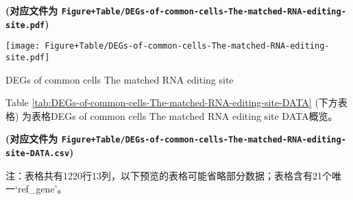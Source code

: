 \documentclass[
]{article}
\begin{document}
\textbf{(对应文件为 \texttt{Figure+Table/DEGs-of-common-cells-The-matched-RNA-editing-site.pdf})}

\def\@captype{figure}
\begin{center}
\texttt{[image: Figure+Table/DEGs-of-common-cells-The-matched-RNA-editing-site.pdf]}
\caption{DEGs of common cells The matched RNA editing site}\label{fig:DEGs-of-common-cells-The-matched-RNA-editing-site}
\end{center}

Table \ref{tab:DEGs-of-common-cells-The-matched-RNA-editing-site-DATA} (下方表格) 为表格DEGs of common cells The matched RNA editing site DATA概览。

\textbf{(对应文件为 \texttt{Figure+Table/DEGs-of-common-cells-The-matched-RNA-editing-site-DATA.csv})}

\begin{center}\begin{tcolorbox}[colback=gray!10, colframe=gray!50, width=0.9\linewidth, arc=1mm, boxrule=0.5pt]注：表格共有1220行13列，以下预览的表格可能省略部分数据；表格含有21个唯一`ref\_gene'。
\end{tcolorbox}
\end{center}
\end{document}

